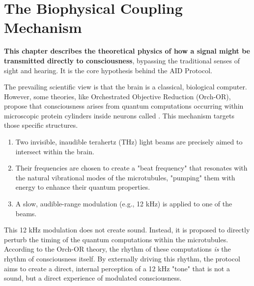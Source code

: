 
\chapter{The Biophysical Coupling Mechanism}
\label{ch:biophysical-coupling}

\begin{nontechnical}
    \textbf{This chapter describes the theoretical physics of how a signal might be transmitted directly to consciousness}, bypassing the traditional senses of sight and hearing. It is the core hypothesis behind the AID Protocol.

    The prevailing scientific view is that the brain is a classical, biological computer. However, some theories, like Orchestrated Objective Reduction (Orch-OR), propose that consciousness arises from quantum computations occurring within microscopic protein cylinders inside neurons called . This mechanism targets those specific structures.

    \begin{enumerate}
        \item Two invisible, inaudible terahertz (THz) light beams are precisely aimed to intersect within the brain.
        \item Their frequencies are chosen to create a "beat frequency" that resonates with the natural vibrational modes of the microtubules, "pumping" them with energy to enhance their quantum properties.
        \item A slow, audible-range modulation (e.g., 12 kHz) is applied to one of the beams.
    \end{enumerate}
    
    This 12 kHz modulation does not create sound. Instead, it is proposed to directly perturb the timing of the quantum computations within the microtubules. According to the Orch-OR theory, the rhythm of these computations \emph{is} the rhythm of consciousness itself. By externally driving this rhythm, the protocol aims to create a direct, internal perception of a 12 kHz "tone" that is not a sound, but a direct experience of modulated consciousness.
\end{nontechnical}


